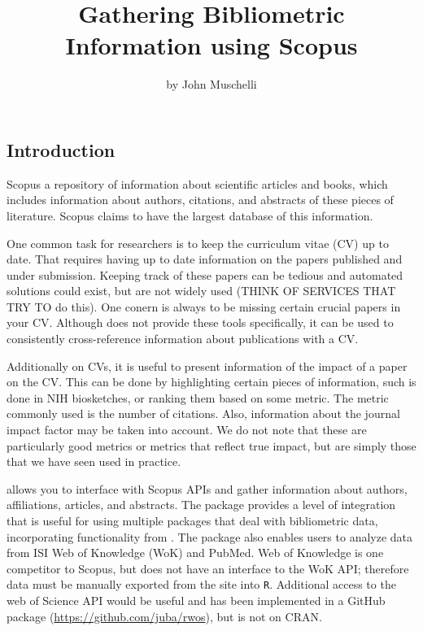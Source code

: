 \title{Gathering Bibliometric Information using Scopus}
\author{by John Muschelli}

\maketitle



\hypertarget{introduction}{%
\subsection{Introduction}\label{introduction}}

Scopus a repository of information about scientific articles and books,
which includes information about authors, citations, and abstracts of
these pieces of literature. Scopus claims to have the largest database
of this information.

One common task for researchers is to keep the curriculum vitae (CV) up
to date. That requires having up to date information on the papers
published and under submission. Keeping track of these papers can be
tedious and automated solutions could exist, but are not widely used
(THINK OF SERVICES THAT TRY TO do this). One conern is always to be
missing certain crucial papers in your CV. Although  does
not provide these tools specifically, it can be used to consistently
cross-reference information about publications with a CV.

Additionally on CVs, it is useful to present information of the impact
of a paper on the CV. This can be done by highlighting certain pieces of
information, such is done in NIH biosketches, or ranking them based on
some metric. The metric commonly used is the number of citations. Also,
information about the journal impact factor may be taken into account.
We do not note that these are particularly good metrics or metrics that
reflect true impact, but are simply those that we have seen used in
practice.

 allows you to interface with Scopus APIs and gather
information about authors, affiliations, articles, and abstracts. The
 package provides a level of integration that is
useful for using multiple packages that deal with bibliometric data,
incorporating functionality from . The 
package also enables users to analyze data from ISI Web of Knowledge
(WoK) and PubMed. Web of Knowledge is one competitor to Scopus, but
 does not have an interface to the WoK API; therefore
data must be manually exported from the site into \texttt{R}. Additional
access to the web of Science API would be useful and has been
implemented in a GitHub package 
(\url{https://github.com/juba/rwos}), but is not on CRAN.

